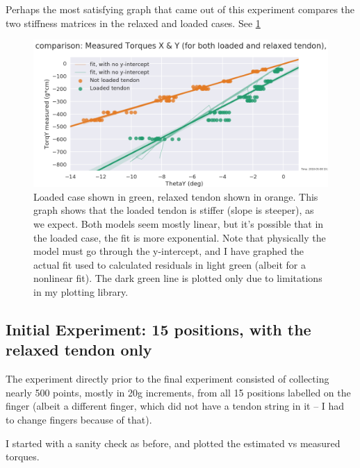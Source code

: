 \documentclass[preprint,12pt,3p]{elsarticle}
\begin{document}
Perhaps the most satisfying graph that came out of this experiment compares the two stiffness
matrices in the relaxed and loaded cases. See  \cref{fig:comparison}

\begin{figure}[H]
\centering
\includegraphics[width=.9\textwidth]{images/stiff/StiffnessComparison.png}
\caption{Loaded case shown in green, relaxed tendon shown in orange. This graph shows that the
loaded tendon is stiffer (slope is steeper), as we expect. Both models seem mostly linear, but it's
possible that in the loaded case, the fit is more exponential. Note that physically the model must
go through the y-intercept, and I have graphed the actual fit used to calculated residuals in light
green (albeit for a nonlinear fit). The dark green line is plotted only due to limitations in my plotting
library.}
\label{fig:comparison}
\end{figure}

\subsection{Initial Experiment: 15 positions, with the relaxed tendon only}
\label{init-data}

The experiment directly prior to the final experiment consisted of collecting nearly 500 points,
mostly in 20g increments, from all 15 positions labelled on the finger (albeit a different finger,
which did not have a tendon string in it -- I had to change fingers because of that).

I started with a sanity check as before, and plotted the estimated vs measured torques.
\end{document}
